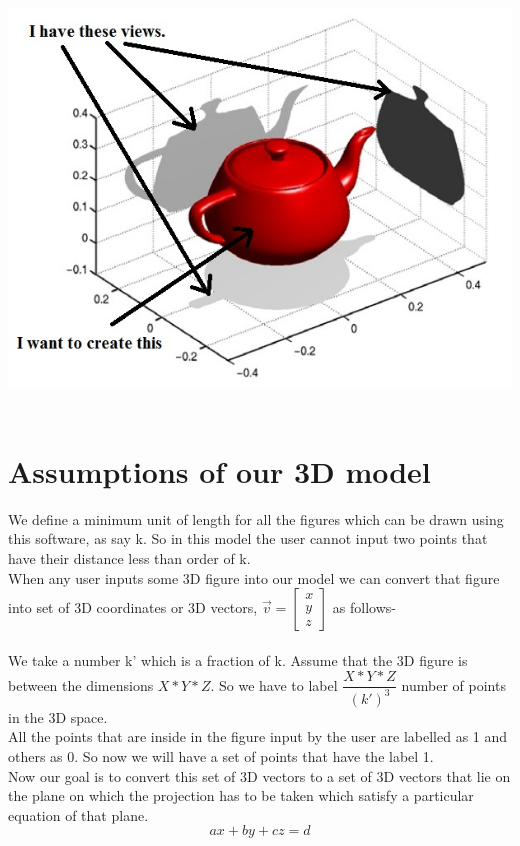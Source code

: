 \documentclass[18pt]{article}
\begin{document}
\includegraphics[scale=0.75]{2d.png}\\{}\\
\section{Assumptions of our 3D model}
\large{We define a minimum unit of length for all the figures which can be drawn using this software, as say k. So in this model the user cannot input two points that have their distance less than order of k.\\
When any user inputs some 3D figure into our model we can convert that figure into set of 3D coordinates or 3D vectors,
$\Vec{v}=\begin{bmatrix} 
x\\
y\\
z
\end{bmatrix}$ as follows-\\{}\\
We take a number k' which is a fraction of k. Assume that the 3D figure is between the dimensions $X*Y*Z$. So we have to label  $\dfrac{X*Y*Z}{(k')^3}$  number of points in the 3D space. \\All the points that are inside in the figure input by the user are labelled as 1 and others as 0. So now we will have a set of points that have the label 1. \\
Now our goal is to convert this set of 3D vectors to a set of 3D vectors that lie on the plane on which the projection has to be taken which satisfy a particular equation of that plane.\\$$ ax + by + cz = d$$ }\\
\end{document}
